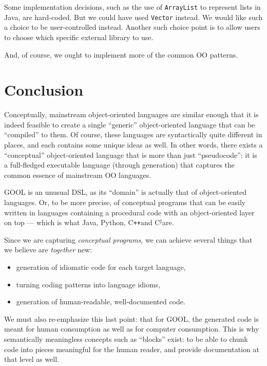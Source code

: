 \documentclass[sigplan,review,anonymous,prologue,dvipsnames]{acmart}
\newcommand{\Csharp}{C$^{\sharp}$}
\newcommand{\Cplusplus}{C\texttt{++}}
\begin{document}
Some implementation decisions, such as the use of \verb|ArrayList| to represent
lists in Java, are hard-coded. But we could have used \verb|Vector| instead.
We would like such a choice to be user-controlled instead. Another such choice
point is to allow users to choose which specific external library to use.

And, of course, we ought to implement more of the common OO patterns.

\section{Conclusion} \label{sec:conclusions}

Conceptually, mainstream object-oriented languages are similar enough that it
is indeed feasible to create a single ``generic'' object-oriented language that
can be ``compiled'' to them.  Of course, these languages are syntactically
quite different in places, and each contains some unique ideas as well.
In other words, there exists a ``conceptual'' object-oriented language that
is more than just ``pseudocode'': it is a full-fledged executable language
(through generation) that captures the common essence of mainstream OO
languages.

GOOL is an unusual DSL, as its ``domain'' is actually that of object-oriented
languages. Or, to be more precise, of conceptual programs that can be
easily written in languages containing a procedural code with an
object-oriented layer on top --- which is what Java, Python, \Cplusplus and
\Csharp are.

Since we are capturing \emph{conceptual programs}, we can achieve
several things that we believe are \emph{together} new:
\begin{itemize}
\item generation of idiomatic code for each target language,
\item turning coding patterns into language idioms,
\item generation of human-readable, well-documented code.
\end{itemize}

We must also re-emphasize this last point: that for GOOL, the generated code
is meant for human consumption as well as for computer consumption. This is
why semantically meaningless concepts such as ``blocks'' exist: to be able
to chunk code into pieces meaningful for the human reader, and provide
documentation at that level as well.

\end{document}
